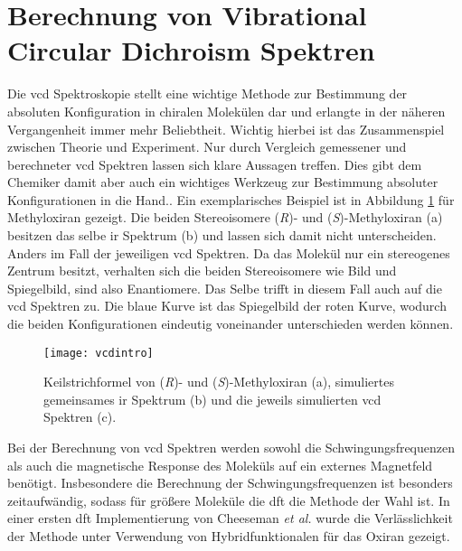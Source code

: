 \section{Berechnung von Vibrational Circular Dichroism Spektren}\label{kap:vcd}
Die \acf{vcd} Spektroskopie stellt eine wichtige Methode zur Bestimmung der absoluten Konfiguration in chiralen Molekülen dar und erlangte in der näheren Vergangenheit immer mehr Beliebtheit. Wichtig hierbei ist das Zusammenspiel zwischen Theorie und Experiment. Nur durch Vergleich gemessener und berechneter \ac{vcd} Spektren lassen sich klare Aussagen treffen. Dies gibt dem Chemiker damit aber auch ein wichtiges Werkzeug zur Bestimmung absoluter Konfigurationen in die Hand.\supercite{magyarfalvi2011vibrational}. Ein exemplarisches Beispiel ist in Abbildung \ref{abb:vcdintro} für Methyloxiran gezeigt. Die beiden Stereoisomere (\textit{R})- und (\textit{S})-Methyloxiran (a) besitzen das selbe \ac{ir} Spektrum (b) und lassen sich damit nicht unterscheiden. Anders im Fall der jeweiligen \ac{vcd} Spektren. Da das Molekül nur ein stereogenes Zentrum besitzt, verhalten sich die beiden Stereoisomere wie Bild und Spiegelbild, sind also Enantiomere. Das Selbe trifft in diesem Fall auch auf die \ac{vcd} Spektren zu. Die blaue Kurve ist das Spiegelbild der roten Kurve, wodurch die beiden Konfigurationen eindeutig voneinander unterschieden werden können. 

\begin{figure}[ht!]
	\centering
	\texttt{[image: vcdintro]}
	\captionsetup{figurewithin = chapter}
	\captionsetup{font=small, labelfont=bf}\caption[\ac{ir} und \ac{vcd} Spektren von (\textit{R})- und (\textit{S})-Methyloxiran]{Keilstrichformel von (\textcolor{myblue}{\textit{R}})- und (\textcolor{myred}{\textit{S}})-Methyloxiran (a), simuliertes gemeinsames \ac{ir} Spektrum (b) und die jeweils simulierten \ac{vcd} Spektren (c).}
\label{abb:vcdintro}
\end{figure}

Bei der Berechnung von \ac{vcd} Spektren werden sowohl die Schwingungsfrequenzen als auch die magnetische Response des Moleküls auf ein externes Magnetfeld benötigt.\supercite{reiter2017vibrational} Insbesondere die Berechnung der Schwingungsfrequenzen ist besonders zeitaufwändig, sodass für größere Moleküle die \ac{dft} die Methode der Wahl ist. In einer ersten \ac{dft} Implementierung von Cheeseman \textit{et al.}\supercite{cheeseman1996ab} wurde die Verlässlichkeit der Methode unter Verwendung von Hybridfunktionalen für das Oxiran gezeigt. 
\FloatBarrier

